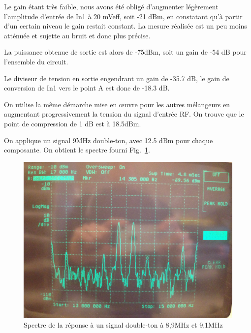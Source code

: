 \documentclass{article}
\begin{document}
Le gain étant très faible, nous avons été obligé d'augmenter légèrement l'amplitude d'entrée de In1 à 20 mVeff, soit -21 dBm, en constatant qu'à partir d'un certain niveau le gain restait constant. La mesure réalisée est un peu moins atténuée et sujette au bruit et donc plus précise.

La puissance obtenue de sortie est alors de -75dBm, soit un gain de -54 dB pour l'ensemble du circuit.

Le diviseur de tension en sortie engendrant un gain de -35.7 dB, le gain de conversion de In1 vers le point A est donc de -18.3 dB.

%
%
%
%
%


On utilise la même démarche mise en œuvre pour les autres mélangeurs en augmentant progressivement la tension du signal d'entrée RF.
On trouve que le point de compression de 1 dB est à 18.5dBm.


On applique un signal 9MHz double-ton, avec 12.5 dBm pour chaque composante. On obtient le spectre fourni Fig.~\ref{fig:11_3_4}.

\begin{figure}[h!]
	\centering
	\includegraphics[width=.7\textwidth]{11_3_4(2eme_point)}
	\caption{Spectre de la réponse à un signal double-ton à 8,9MHz et 9,1MHz}
	\label{fig:11_3_4}
\end{figure}
\end{document}
